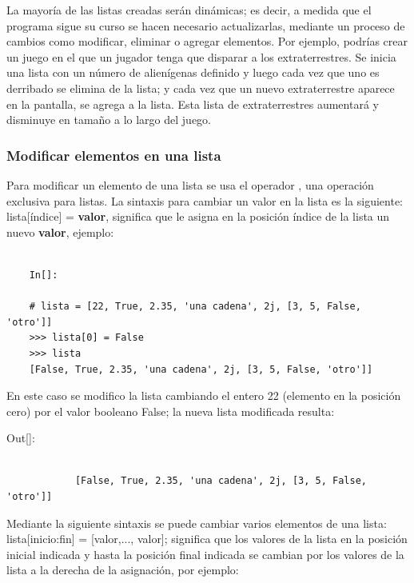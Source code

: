 La mayoría de las listas creadas serán dinámicas; es decir, a medida que el programa sigue su curso se hacen necesario actualizarlas, mediante un proceso de cambios como  modificar, eliminar o agregar elementos. Por ejemplo, podrías crear un juego en el que un jugador tenga que disparar a los extraterrestres. Se inicia una lista con un número  de alienígenas definido y luego cada vez que uno es derribado se  elimina  de la lista; y cada vez que un nuevo extraterrestre aparece en la pantalla, se  agrega a la lista. Esta lista de extraterrestres aumentará y disminuye en tamaño a lo largo del juego.



\subsubsection{Modificar elementos en una lista}


Para modificar   un elemento  de una  lista se usa el operador {\ttfamily[]},  una  operación exclusiva  para listas.  La  sintaxis para cambiar un valor en la lista es la siguiente: {\ttfamily lista[índice] = {\bf{valor}}},  significa que le asigna en la posición índice de la lista un  nuevo  {\bf{valor}}, ejemplo:

\begin{lstlisting}
	
	In[]:
	
	# lista = [22, True, 2.35, 'una cadena', 2j, [3, 5, False, 'otro']]
	>>> lista[0] = False
	>>> lista
	[False, True, 2.35, 'una cadena', 2j, [3, 5, False, 'otro']]
\end{lstlisting}
En este caso se modifico la lista cambiando el entero 22 (elemento en la posición cero) por el valor booleano {\ttfamily False}; la nueva lista modificada resulta: \\

{\ttfamily\scriptsize\scriptsize 
	\hspace{-0.65cm}Out[]:\vspace{-0.3cm}	
	{\color{blue} 	
		\begin{verbatim}
			
			[False, True, 2.35, 'una cadena', 2j, [3, 5, False, 'otro']]
		\end{verbatim}
}}


Mediante la siguiente sintaxis se puede cambiar varios elementos de una lista:  {\ttfamily  lista[inicio:fin] = [valor,..., valor]}; significa que los valores de la lista en la posición inicial indicada y hasta la posición final indicada se cambian por los valores de la lista a la derecha de la asignación,  por  ejemplo: 

